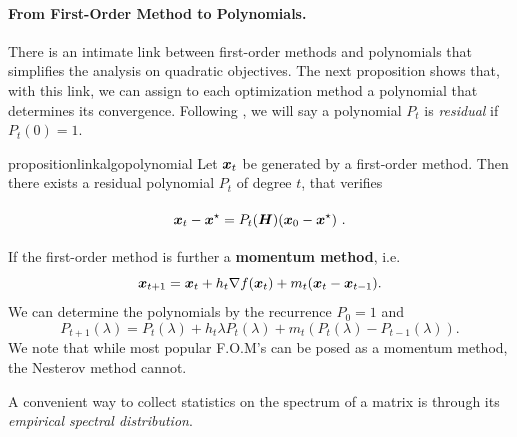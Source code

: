 \documentclass{article}
\begin{document}
\paragraph{From First-Order Method to Polynomials.}
There is an intimate link between first-order methods and polynomials that simplifies the analysis on quadratic objectives. The next proposition shows that, with this link, we can assign to each optimization method a polynomial that determines its convergence.
Following \cite{fischer1996polynomial}, we will say a polynomial $P_t$ is \textit{residual} if $P_t(0)=1$.

\begin{restatable}{proposition}{linkalgopolynomial}
    \label{prop:link_algo_polynomial} \citep{hestenes1952methods}
    Let ${\boldsymbol x}_t$ be generated by a first-order method. Then there exists a residual polynomial $P_t$ of degree $t$, that verifies
    \begin{equation}\label{eq:polynomial_iterates}
        \vphantom{\sum^n}{\boldsymbol x}_{t}-{\boldsymbol x}^\star = P_t({\boldsymbol H})({\boldsymbol x}_0-{\boldsymbol x}^\star)~.
    \end{equation}
\end{restatable}

\begin{remark} \label{rmk: momentum based}
If the first-order method is further a \textbf{momentum method}, i.e.
$$
    {\boldsymbol x}_{t+1}={\boldsymbol x}_t+h_t\nabla f({\boldsymbol x}_t)+m_t({\boldsymbol x}_t-{\boldsymbol x}_{t-1}) .
$$
We can determine the polynomials by the recurrence $P_0=1$ and
    \begin{equation*}
        P_{t+1}(\lambda)=P_t(\lambda)+h_t\lambda P_t(\lambda)+m_t(P_t(\lambda)-P_{t-1}(\lambda)) .
    \end{equation*}
We note that while most popular F.O.M's can be posed as a momentum method, the Nesterov method cannot.
\end{remark}






A convenient way to collect statistics on the spectrum of a matrix is through its \emph{empirical spectral distribution}.
\end{document}
